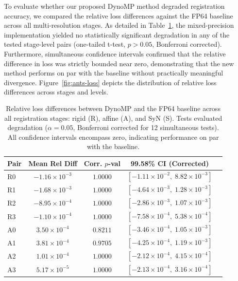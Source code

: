 \documentclass[runningheads]{llncs}
\begin{document}
To evaluate whether our proposed DynoMP method degraded registration accuracy,
we compared the relative loss differences against the FP64 baseline across all
multi-resolution stages. As detailed in
Table~\ref{tab:ants-stats}, the mixed-precision implementation yielded no
statistically significant degradation in any of the tested stage-level pairs (one-tailed t-test, $p
> 0.05$, Bonferroni corrected). Furthermore, simultaneous confidence intervals
confirmed that the relative difference in loss was strictly bounded near zero,
demonstrating that the new method performs on par with the baseline without
practically meaningful divergence. Figure~\ref{fig:ants-loss} depicts the
distribution of relative loss differences across stages and levels.
\begin{table}[b!]
	\centering
	\caption{Relative loss differences between DynoMP and the FP64 baseline across all registration stages: rigid (R), affine (A), and SyN (S). Tests evaluated degradation  ($\alpha=0.05$, Bonferroni corrected for 12 simultaneous tests). All confidence intervals encompass zero, indicating performance on par with the baseline.}
	\label{tab:ants-stats}
	\begin{tabular}{lcccl}
		\toprule
		\textbf{Pair} & \textbf{Mean Rel Diff} & \textbf{Corr. $p$-val} & \textbf{99.58\% CI (Corrected)}                  \\
		\midrule
		R0            & $-1.16 \times 10^{-3}$ & $1.0000$               & $[-1.11 \times 10^{-2}, \; 8.82 \times 10^{-3}]$ \\
		R1            & $-1.68 \times 10^{-3}$ & $1.0000$               & $[-4.64 \times 10^{-3}, \; 1.28 \times 10^{-3}]$ \\
		R2            & $-8.95 \times 10^{-4}$ & $1.0000$               & $[-2.86 \times 10^{-3}, \; 1.07 \times 10^{-3}]$ \\
		R3            & $-1.10 \times 10^{-4}$ & $1.0000$               & $[-7.58 \times 10^{-4}, \; 5.38 \times 10^{-4}]$ \\
		A0            & $3.50 \times 10^{-4}$  & $0.8211$               & $[-3.46 \times 10^{-4}, \; 1.05 \times 10^{-3}]$ \\
		A1            & $3.81 \times 10^{-4}$  & $0.9705$               & $[-4.25 \times 10^{-4}, \; 1.19 \times 10^{-3}]$ \\
		A2            & $1.01 \times 10^{-4}$  & $1.0000$               & $[-2.12 \times 10^{-4}, \; 4.15 \times 10^{-4}]$ \\
		A3            & $5.17 \times 10^{-5}$  & $1.0000$               & $[-2.13 \times 10^{-4}, \; 3.16 \times 10^{-4}]$ \\

\end{tabular}
\end{table}
\end{document}
